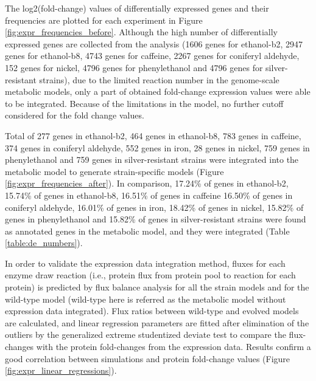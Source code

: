 \vspace{-1cm}


The log2(fold-change) values of differentially expressed genes and their frequencies are plotted for each experiment in Figure \ref{fig:expr_frequencies_before}. Although the high number of differentially expressed genes are collected from the analysis (1606 genes for ethanol-b2, 2947 genes for ethanol-b8, 4743 genes for caffeine, 2267 genes for coniferyl aldehyde, 152 genes for nickel, 4796 genes for phenylethanol and 4796 genes for silver-resistant strains), due to the limited reaction number in the genome-scale metabolic models, only a part of obtained fold-change expression values were able to be integrated. Because of the limitations in the model, no further cutoff considered for the fold change values.

Total of 277 genes in ethanol-b2, 464 genes in ethanol-b8, 783 genes in caffeine, 374 genes in coniferyl aldehyde, 552 genes in iron, 28 genes in nickel, 759 genes in phenylethanol and 759 genes in silver-resistant strains were integrated into the metabolic model to generate strain-specific models (Figure \ref{fig:expr_frequencies_after}). In comparison, 17.24\% of genes in ethanol-b2, 15.74\% of genes in ethanol-b8, 16.51\% of genes in caffeine	16.50\% of genes in coniferyl aldehyde, 16.01\% of genes in iron, 18.42\% of genes	in nickel, 15.82\% of genes in phenylethanol and 15.82\%  of genes in silver-resistant strains were found as annotated genes in the metabolic model, and they were integrated (Table \ref{table:de_numbers}).

In order to validate the expression data integration method, fluxes for each enzyme draw reaction (i.e., protein flux from protein pool to reaction for each protein) is predicted by flux balance analysis for all the strain models and for the wild-type model (wild-type here is referred as the metabolic model without expression data integrated). Flux ratios between wild-type and evolved models are calculated, and linear regression parameters are fitted after elimination of the outliers by the generalized extreme studentized deviate test to compare the flux-changes with the protein fold-changes from the expression data. Results confirm a good correlation between simulations and protein fold-change values (Figure \ref{fig:expr_linear_regressions}).

